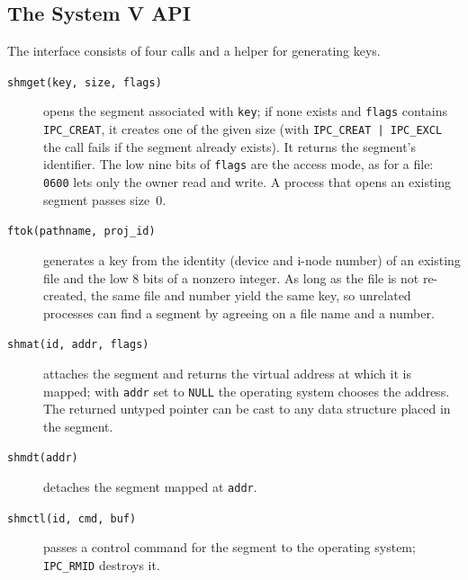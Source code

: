 \documentclass[../main.tex]{subfiles}
\begin{document}
\subsection{The System V API}

The interface consists of four calls and a helper for generating keys.
\begin{description}
  \item[\texttt{shmget(key, size, flags)}] opens the segment associated
    with \texttt{key}; if none exists and \texttt{flags} contains
    \texttt{IPC\_CREAT}, it creates one of the given size (with
    \texttt{IPC\_CREAT | IPC\_EXCL} the call fails if the segment already
    exists).  It returns the segment's identifier.  The low nine
    bits of \texttt{flags} are the access mode, as for a file:
    \texttt{0600} lets only the owner read and write.  A process that opens
    an existing segment passes size~0.
  \item[\texttt{ftok(pathname, proj\_id)}] generates a key from the identity
    (device and i-node number) of an existing file and the low 8 bits of a
    nonzero integer.  As long as the file is not re-created, the same file
    and number yield the same key, so unrelated processes can find a segment
    by agreeing on a file name and a number.
  \item[\texttt{shmat(id, addr, flags)}] attaches the segment and returns the
    virtual address at which it is mapped; with \texttt{addr} set to
    \texttt{NULL} the operating system chooses the address.  The returned
    untyped pointer can be cast to any data structure placed in the segment.
  \item[\texttt{shmdt(addr)}] detaches the segment mapped at \texttt{addr}.
  \item[\texttt{shmctl(id, cmd, buf)}] passes a control command for the
    segment to the operating system; \texttt{IPC\_RMID} destroys it.
\end{description}
\end{document}
